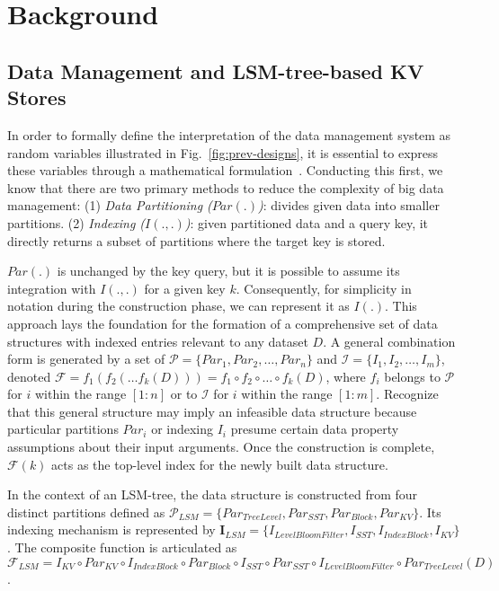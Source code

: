 \section{Background}
\label{sec:background}

\subsection{Data Management and LSM-tree-based KV Stores}
\label{sec:rocksdb}
In order to formally define the interpretation of the data management system as random variables illustrated in Fig.~\ref{fig:prev-designs}, it is essential to express these variables through a mathematical formulation~\cite{2024limousine}. Conducting this first, we know that there are two primary methods to reduce the complexity of big data management: (1) \textit{Data Partitioning ($Par(.)$)}: divides given data into smaller partitions. (2) \textit{Indexing ($I(.,.)$)}: given partitioned data and a query key, it directly returns a subset of partitions where the target key is stored.

$Par(.)$ is unchanged by the key query, but it is possible to assume its integration with $I(.,.)$ for a given key $k$. Consequently, for simplicity in notation during the construction phase, we can represent it as $I(.)$. This approach lays the foundation for the formation of a comprehensive set of data structures with indexed entries relevant to any dataset $D$. A general combination form is generated by a set of $\mathcal{P}=\{ Par_1, Par_2, \dots, Par_n \}$ and $\mathcal{I}=\{ I_1, I_2, \dots, I_m \}$, denoted $\mathcal{F}=f_1(f_2(\dots f_k(D)))=f_1\circ f_2\circ\dots\circ f_k(D)$, where $f_i$ belongs to $\mathcal{P}$ for $i$ within the range $[1:n]$ or to $\mathcal{I}$ for $i$ within the range $[1:m]$. Recognize that this general structure may imply an infeasible data structure because particular partitions $Par_i$ or indexing $I_i$ presume certain data property assumptions about their input arguments. Once the construction is complete, $\mathcal{F}(k)$ acts as the top-level index for the newly built data structure.

In the context of an LSM-tree, the data structure is constructed from four distinct partitions defined as $\mathcal{P}_{LSM}=\{ Par_{TreeLevel}, Par_{SST}, Par_{Block}, Par_{KV} \}$. Its indexing mechanism is represented by $\mathbf{I}_{LSM}=\{ I_{LevelBloomFilter}, I_{SST}, I_{IndexBlock}, I_{KV} \}$. The composite function is articulated as $\mathcal{F}_{LSM}= I_{KV} \circ Par_{KV}\circ I_{IndexBlock}\circ Par_{Block}\circ I_{SST}\circ Par_{SST}\circ I_{LevelBloomFilter}\circ Par_{TreeLevel}(D)$.

